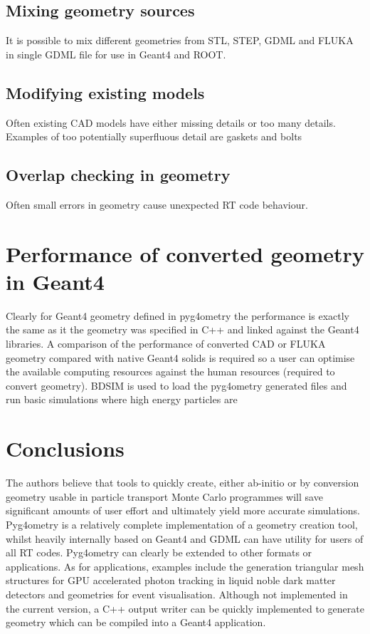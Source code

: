 \documentclass[final,5p,times,twocolumn]{elsarticle}
\begin{document}
\subsection{Mixing geometry sources}
It is possible to mix different geometries from STL, STEP, GDML and FLUKA in single GDML file for use in Geant4 and ROOT. 

\subsection{Modifying existing models}
Often existing CAD models have either missing details or too many details. Examples of too potentially superfluous detail are gaskets and bolts 

\subsection{Overlap checking in geometry}
Often small errors in geometry cause unexpected RT code behaviour.  

\section{Performance of converted geometry in Geant4}
Clearly for Geant4 geometry defined in pyg4ometry the performance is exactly the same as it the geometry was specified in C++ and linked against the Geant4
libraries. A comparison of the performance of converted CAD or FLUKA geometry compared with native Geant4 solids is required so a user can optimise the available
computing resources against the human resources (required to convert geometry). BDSIM is used to load the pyg4ometry generated files  and run basic simulations where 
high energy particles are   

\section{Conclusions}
The authors believe that tools to quickly create, either ab-initio or by conversion geometry usable in particle transport Monte Carlo programmes will save significant 
amounts of user effort and ultimately yield more accurate simulations. Pyg4ometry is a relatively complete implementation of a geometry creation tool, whilst heavily 
internally based on Geant4 and GDML can have utility for users of all RT codes. Pyg4ometry can clearly be extended to other formats or applications. As for applications,
examples include  the  generation triangular mesh structures for GPU accelerated photon tracking in liquid noble  dark matter detectors and geometries for event visualisation. 
Although not implemented in the current version, a C++ output writer can be quickly implemented to generate geometry which can be compiled into a Geant4 application. 
\end{document}
